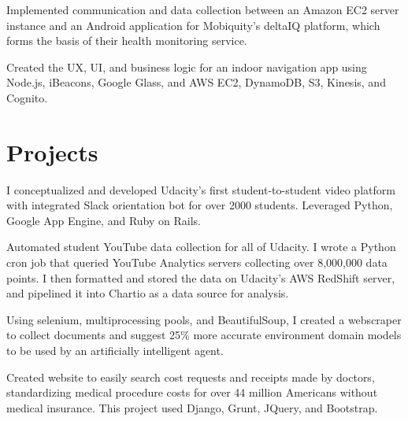 \documentclass[]{deedy-resume-openfont}
\begin{document}
\begin{minipage}[t]{0.66\textwidth}
\begin{tightemize}
\item Implemented communication and data collection between an Amazon EC2 server instance and an Android application for Mobiquity’s deltaIQ platform, which forms the basis of their health monitoring service.

\item Created the UX, UI, and business logic for an indoor navigation app using Node.js, iBeacons, Google Glass, and AWS EC2, DynamoDB, S3, Kinesis, and Cognito.
\end{tightemize}


\section{Projects}

\begin{tightemize}
\item I conceptualized and developed Udacity's first student-to-student video platform with integrated Slack orientation bot for over 2000 students. Leveraged Python, Google App Engine, and Ruby on Rails.
\end{tightemize}
\sectionsep

\begin{tightemize}
\item Automated student YouTube data collection for all of Udacity. I wrote a Python cron job that queried YouTube Analytics servers collecting over 8,000,000 data points. I then formatted and stored the data on Udacity's AWS RedShift server, and pipelined it into Chartio as a data source for analysis.
\end{tightemize}
\sectionsep

\begin{tightemize}
\item Using selenium, multiprocessing pools, and BeautifulSoup, I created a webscraper to collect documents and suggest 25\% more accurate environment domain models to be used by an artificially intelligent agent. 
\end{tightemize}
\sectionsep

\begin{tightemize}
\item Created website to easily search cost requests and receipts made by doctors, standardizing medical procedure costs for over 44 million Americans without medical insurance. This project used Django, Grunt, JQuery, and Bootstrap.
\end{tightemize}
\sectionsep


\end{minipage}
\end{document}
